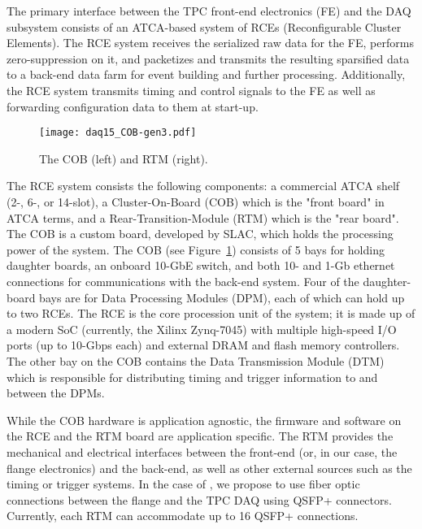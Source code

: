 The primary interface between the TPC front-end electronics (FE) and
the DAQ subsystem consists of an ATCA-based system of RCEs
(Reconfigurable Cluster Elements).  The RCE system receives the
serialized raw data for the FE, performs zero-suppression on it, and
packetizes and transmits the resulting sparsified data to a back-end
data farm for event building and further processing.  Additionally,
the RCE system transmits timing and control signals to the FE as well
as forwarding configuration data to them at start-up.

\begin{figure}[hbt]
  \texttt{[image: daq15\_COB-gen3.pdf]}
  \caption{\label{fig:daq15_cob} The COB (left) and RTM (right).  }
\end{figure}
The RCE system consists the following components: a commercial ATCA
shelf (2-, 6-, or 14-slot), a Cluster-On-Board (COB) which is the
"front board" in ATCA terms, and a Rear-Transition-Module (RTM) which
is the "rear board".  The COB is a custom board, developed by SLAC,
which holds the processing power of the system.  The COB (see
Figure~\ref{fig:daq15_cob}) consists of 5 bays for holding daughter
boards, an onboard 10-GbE switch, and both 10- and 1-Gb ethernet
connections for communications with the back-end system.  Four of the
daughter-board bays are for Data Processing Modules (DPM), each of
which can hold up to two RCEs.  The RCE is the core procession unit of
the system; it is made up of a modern SoC (currently, the Xilinx
Zynq-7045) with multiple high-speed I/O ports (up to 10-Gbps each) and
external DRAM  and flash memory controllers.  The
other bay on the COB contains the Data Transmission Module (DTM) which
is responsible for distributing timing and trigger information to and
between the DPMs.

While the COB hardware is application agnostic, the firmware and
software on the RCE and the RTM board are application specific. The
RTM provides the mechanical and electrical interfaces between the
front-end (or, in our case, the flange electronics) and the back-end,
as well as other external sources such as the timing or trigger
systems.  In the case of \LBNE, we propose  to use fiber optic connections between
the flange and the TPC DAQ using QSFP+ connectors.  Currently, each
RTM can accommodate up to 16 QSFP+ connections.


